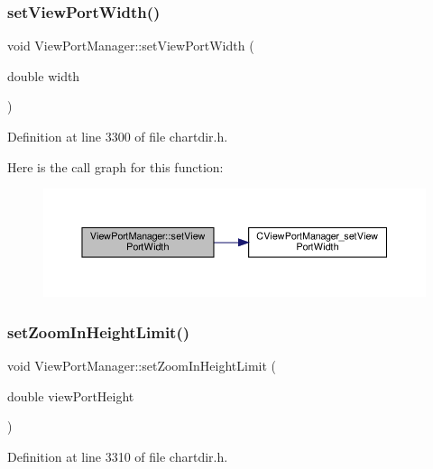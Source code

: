 \subsubsection{\texorpdfstring{set\+View\+Port\+Width()}{setViewPortWidth()}}
{\footnotesize\ttfamily void View\+Port\+Manager\+::set\+View\+Port\+Width (\begin{DoxyParamCaption}\item[{double}]{width }\end{DoxyParamCaption})\hspace{0.3cm}{\ttfamily [inline]}}



Definition at line 3300 of file chartdir.\+h.

Here is the call graph for this function\+:
\nopagebreak
\begin{figure}[H]
\begin{center}
\leavevmode
\includegraphics[width=350pt]{class_view_port_manager_adf549fbcace60757aedebff857d9c0dc_cgraph}
\end{center}
\end{figure}
\mbox{\label{class_view_port_manager_aa3522d8d5cccfc890922fcbbe12eb919}} 
\subsubsection{\texorpdfstring{set\+Zoom\+In\+Height\+Limit()}{setZoomInHeightLimit()}}
{\footnotesize\ttfamily void View\+Port\+Manager\+::set\+Zoom\+In\+Height\+Limit (\begin{DoxyParamCaption}\item[{double}]{view\+Port\+Height }\end{DoxyParamCaption})\hspace{0.3cm}{\ttfamily [inline]}}



Definition at line 3310 of file chartdir.\+h.

